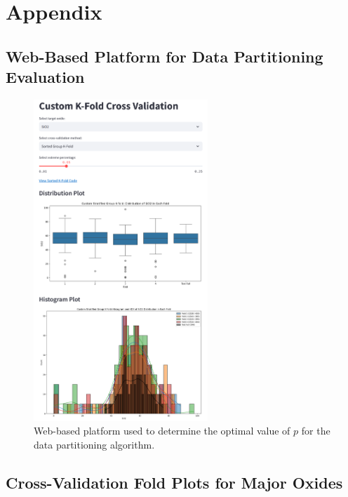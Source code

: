 \onecolumn
\section*{Appendix}

\subsection{Web-Based Platform for Data Partitioning Evaluation}\label{subsec:web_platform}
\begin{figure}[!htb]
    \centering
    \includegraphics[width=0.585\textwidth]{images/web_platform.png}
    \caption{Web-based platform used to determine the optimal value of $p$ for the data partitioning algorithm.}
    \label{fig:web_platform}
\end{figure}

\newpage
\FloatBarrier

\subsection{Cross-Validation Fold Plots for Major Oxides}\label{subsec:cv_plots}

